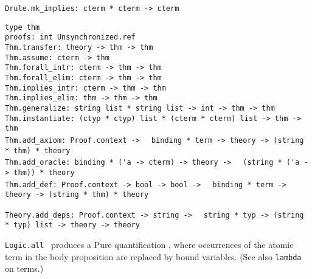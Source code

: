 \begin{isabellebody}
\begin{isamarkuptext}
\begin{mldecls}
  \verb|Drule.mk_implies: cterm * cterm -> cterm| \\
  \end{mldecls}
  \begin{mldecls}
  \verb|type thm| \\
  \verb|proofs: int Unsynchronized.ref| \\
  \verb|Thm.transfer: theory -> thm -> thm| \\
  \verb|Thm.assume: cterm -> thm| \\
  \verb|Thm.forall_intr: cterm -> thm -> thm| \\
  \verb|Thm.forall_elim: cterm -> thm -> thm| \\
  \verb|Thm.implies_intr: cterm -> thm -> thm| \\
  \verb|Thm.implies_elim: thm -> thm -> thm| \\
  \verb|Thm.generalize: string list * string list -> int -> thm -> thm| \\
  \verb|Thm.instantiate: (ctyp * ctyp) list * (cterm * cterm) list -> thm -> thm| \\
  \verb|Thm.add_axiom: Proof.context ->|\isasep\isanewline%
\verb|  binding * term -> theory -> (string * thm) * theory| \\
  \verb|Thm.add_oracle: binding * ('a -> cterm) -> theory ->|\isasep\isanewline%
\verb|  (string * ('a -> thm)) * theory| \\
  \verb|Thm.add_def: Proof.context -> bool -> bool ->|\isasep\isanewline%
\verb|  binding * term -> theory -> (string * thm) * theory| \\
  \end{mldecls}
  \begin{mldecls}
  \verb|Theory.add_deps: Proof.context -> string ->|\isasep\isanewline%
\verb|  string * typ -> (string * typ) list -> theory -> theory| \\
  \end{mldecls}

  \begin{description}

  \item \verb|Logic.all|~ produces a Pure quantification
  , where occurrences of the atomic term  in
  the body proposition  are replaced by bound variables.
  (See also \verb|lambda| on terms.)


\end{description}
\end{isamarkuptext}
\end{isabellebody}
